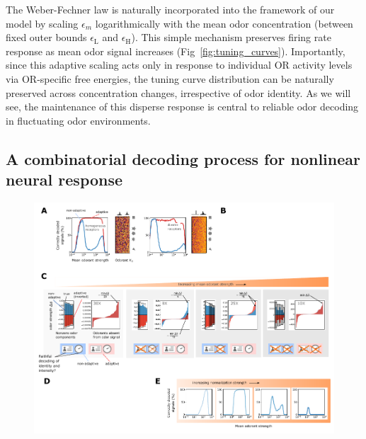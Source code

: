 The Weber-Fechner law is naturally incorporated into the framework of our model by scaling $\epsilon_m$ logarithmically with the mean odor concentration (between fixed outer bounds $\epsilon_{\text {L}}$ and $\epsilon_{\text {H}}$). This simple mechanism preserves firing rate response as mean odor signal increases (Fig~\ref{fig:tuning_curves}). Importantly, since this adaptive scaling acts only in response to individual OR activity levels via OR-specific free energies, the tuning curve distribution can be naturally preserved across concentration changes, irrespective of odor identity. As we will see, the maintenance of this disperse response is central to reliable odor decoding in fluctuating odor environments. 


\subsection{A combinatorial decoding process for nonlinear neural response}

\begin{figure}
	\includegraphics[width=\textwidth]{figures/Figures_signal_decoding_weber_law}
\end{figure}


